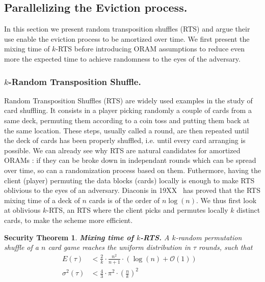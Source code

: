 \documentclass[english,oneside,twocolumn]{article}
\newtheorem{secthm}{Security Theorem}
\begin{document}
\subsection{Parallelizing the Eviction process.}
In this section we present random transposition shuffles (RTS) and argue their use enable the eviction process to be amortized over time.
We first present the mixing time of $k$-RTS before introducing ORAM assumptions to reduce even more the expected time to achieve randomness to the eyes of the adversary.

\subsubsection{$k$-Random Transposition Shuffle.}
Random Transposition Shuffles (RTS) are widely used examples in the study of card shuffling. It consists in a player picking randomly a couple of cards from a same deck, permuting them according to a coin toss and putting them back at the same location.
These steps, usually called a round, are then repeated until the deck of cards has been properly shuffled, i.e. until every card arranging is possible.
We can already see why RTS are natural candidates for amortized ORAMs : if they can be broke down in independant rounds which can be spread over time, so can a randomization process based on them. Futhermore, having the client (player) permuting the data blocks (cards) locally is enough to make RTS oblivious to the eyes of an adversary.
Diaconis in 19XX~\cite{} has proved that the RTS mixing time of a deck of $n$ cards is of the order of $n\log(n)$. We thus first look at oblivious $k$-RTS, an RTS where the client picks and permutes locally $k$ distinct cards, to make the scheme more efficient.

\begin{secthm}
\textbf{Mixing time of $k$-RTS.} A $k$-random permutation shuffle of a $n$ card game reaches the uniform distribution in $\tau$ rounds, such that
\begin{align*}
E(\tau) &< \frac{2}{k}\cdot\frac{n^2}{n+1}\cdot \left ( \log(n) + \mathcal{O}(1) \right ) &\\
\sigma^2(\tau) &< \frac{4}{3} \cdot {\pi}^2 \cdot \left ( \frac{n}{k} \right )^2 &
\end{align*}
\end{secthm}
\end{document}
